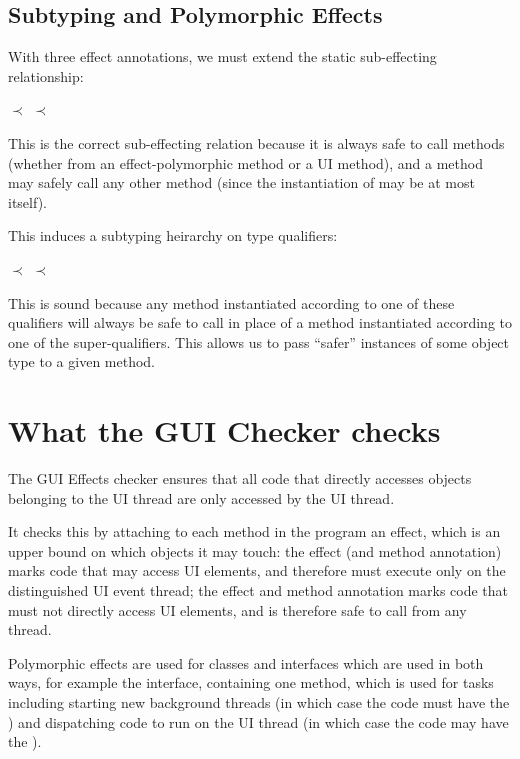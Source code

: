 \subsection{Subtyping and Polymorphic Effects}
With three effect annotations, we must extend the static sub-effecting relationship:

\centerline{ $\prec$  $\prec$ }

This is the correct sub-effecting relation because it is always safe to call 
methods (whether from an effect-polymorphic method or a UI method), and a  method
may safely call any other method (since the instantiation of  may be at most
 itself).

This induces a subtyping heirarchy on type qualifiers:

\centerline{ $\prec$  $\prec$ }

This is sound because any method instantiated according to one of these qualifiers will always be
safe to call in place of a method instantiated according to one of the super-qualifiers.
This allows us to pass ``safer'' instances of some object type to a given method.

\section{What the GUI Checker checks\label{gui-checks}}
The GUI Effects checker ensures that all code that directly accesses objects belonging to the UI
thread are only accessed by the UI thread.

It checks this by attaching to each method in the program an effect, which is an upper bound on
which objects it may touch: the  effect (and method annotation) marks code that may
access UI elements, and therefore must execute only on the distinguished UI event thread; the
 effect and method annotation marks code that must not directly access UI
elements, and is therefore safe to call from any thread.

Polymorphic effects are used for classes and interfaces which are used in both ways, for example the
 interface, containing one method, which is used for tasks including
starting new background threads (in which case the code must have the ) and
dispatching code to run on the UI thread (in which case the code may have the ).

